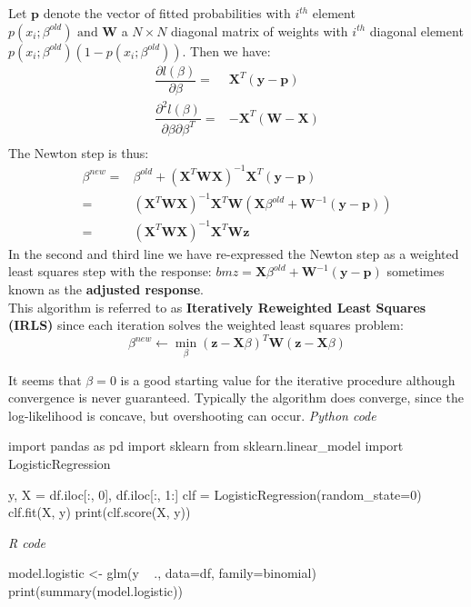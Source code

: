 Let $\bm{p}$ denote the vector of fitted probabilities with $i^{th}$ element $p(x_{i};\beta^{old})
\text{ and } \bm{W}$ a $N\times N$ diagonal matrix of weights with $i^{th}$ diagonal element
$p(x_{i};\beta^{old})(1-p(x_{i};\beta^{old}))$. Then we have:
\begin{align*}
	\dfrac{\partial l(\beta)}{\partial\beta} =& \bm{X}^{T}(\bm{y}-\bm{p})\\
	\dfrac{\partial^{2} l(\beta)}{\partial\beta\partial\beta^{T}} =&
	-\bm{X}^{T}(\bm{W}-\bm{X})\\
\end{align*}
The Newton step is thus:
\begin{align*}
	\beta^{new} =& \beta^{old} + \left( \bm{X}^{T}\bm{W}\bm{X} \right)^{-1}\bm{X}^{T}(\bm{y}-\bm{p})\\
	=& \left( \bm{X}^{T}\bm{W}\bm{X} \right)^{-1}\bm{X}^{T}\bm{W}\left( \bm{X}\beta^{old}+
	\bm{W}^{-1}(\bm{y}-\bm{p})\right)\\
	=& \left( \bm{X}^{T}\bm{W}\bm{X} \right)^{-1}\bm{X}^{T}\bm{W}\bm{z}
\end{align*}
In the second and third line we have re-expressed the Newton step as a weighted least squares step
with the response: $bm{z} = \bm{X}\beta^{old}+ \bm{W}^{-1}(\bm{y}-\bm{p})$ sometimes known as the
\textbf{adjusted response}.\\
This algorithm is referred to as \textbf{Iteratively Reweighted Least Squares (IRLS)} since each
iteration solves the weighted least squares problem: $$ \beta^{new}\leftarrow\min\limits_{\beta}
\left( \bm{z} - \bm{X}\beta \right)^{T}\bm{W}\left( \bm{z} - \bm{X}\beta \right)$$

It seems that $\beta=0$ is a good starting value for the iterative procedure although convergence
is never guaranteed. Typically the algorithm does converge, since the log-likelihood is concave,
but overshooting can occur.
\emph{Python code}
\begin{python}
import pandas as pd
import sklearn
from sklearn.linear_model import LogisticRegression

y, X = df.iloc[:, 0], df.iloc[:, 1:]
clf = LogisticRegression(random_state=0)
clf.fit(X, y)
print(clf.score(X, y))
\end{python}

\emph{R code}
\begin{rcode}[deletekeywords={model, df, data, family, binomial}]
model.logistic <- glm(y ~ ., data=df, family=binomial)
print(summary(model.logistic))
\end{rcode}
